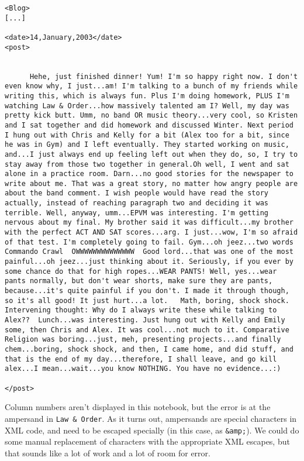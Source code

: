 \documentclass[11pt]{article}
\begin{document}
\begin{verbatim}
<Blog>
[...]

<date>14,January,2003</date>
<post>


      Hehe, just finished dinner! Yum! I'm so happy right now. I don't even know why, I just...am! I'm talking to a bunch of my friends while writing this, which is always fun. Plus I'm doing homework, PLUS I'm watching Law & Order...how massively talented am I? Well, my day was pretty kick butt. Umm, no band OR music theory...very cool, so Kristen and I sat together and did homework and discussed Winter. Next period I hung out with Chris and Kelly for a bit (Alex too for a bit, since he was in Gym) and I left eventually. They started working on music, and...I just always end up feeling left out when they do, so, I try to stay away from those two together in general.Oh well, I went and sat alone in a practice room. Darn...no good stories for the newspaper to write about me. That was a great story, no matter how angry people are about the band comment. I wish people would have read the story actually, instead of reaching paragraph two and deciding it was terrible. Well, anyway, umm...EPVM was interesting. I'm getting nervous about my final. My brother said it was difficult...my brother with the perfect ACT AND SAT scores...arg. I just...wow, I'm so afraid of that test. I'm completely going to fail. Gym...oh jeez...two words  Commando Crawl  OWWWWWWWWWWWWWW  Good lord...that was one of the most painful...oh jeez...just thinking about it. Seriously, if you ever by some chance do that for high ropes...WEAR PANTS! Well, yes...wear pants normally, but don't wear shorts, make sure they are pants, because...it's quite painful if you don't. I made it through though, so it's all good! It just hurt...a lot.   Math, boring, shock shock.  Intervening thought: Why do I always write these while talking to Alex??  Lunch...was interesting. Just hung out with Kelly and Emily some, then Chris and Alex. It was cool...not much to it. Comparative Religion was boring...just, meh, presenting projects...and finally chem...boring, shock shock, and then, I came home, and did stuff, and that is the end of my day...therefore, I shall leave, and go kill alex...I mean...wait...you know NOTHING. You have no evidence...:)

</post>
\end{verbatim}

    Column numbers aren't displayed in this notebook, but the error is at
the ampersand in \texttt{Law\ \&\ Order}. As it turns out, ampersands
are special characters in XML code, and need to be escaped specially (in
this case, as \texttt{\&amp;}). We could do some manual replacement of
characters with the appropriate XML escapes, but that sounds like a lot
of work and a lot of room for error.
\end{document}
